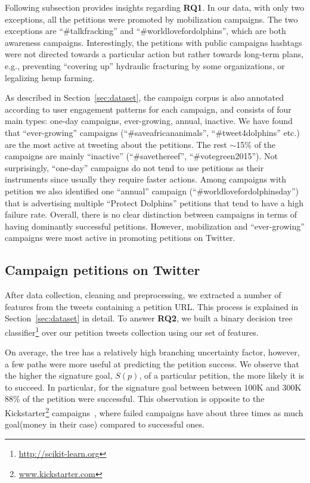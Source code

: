 Following subsection provides insights regarding \textbf{RQ1}.
In our data, with only two exceptions, all the petitions were promoted by mobilization campaigns. The two exceptions are ``\#talkfracking'' and ``\#worldlovefordolphins'', which are both awareness campaigns.
Interestingly, the petitions with public campaigns hashtags were not directed towards a particular action but rather towards long-term plans, e.g., preventing ``covering up'' hydraulic fracturing by some organizations, or legalizing hemp farming.

As described in Section~\ref{sec:dataset}, the campaign corpus is also annotated according to user engagement patterns for each campaign, and consists of four main types: one-day campaigns, ever-growing, annual, inactive.
We have found that ``ever-growing'' campaigns (``\#saveafricananimals'', ``\#tweet4dolphins'' etc.) are the most active at tweeting about the petitions.
The rest $\sim$15\% of the campaigns are mainly ``inactive'' (``\#savethereef'', ``\#votegreen2015'').
Not surprisingly, ``one-day'' campaigns do not tend to use petitions as their instruments since usually they require faster actions.
Among campaigns with petition we also identified one ``annual'' campaign (``\#worldlovefordolphinsday'') that is advertising multiple ``Protect Dolphins'' petitions that tend to have a high failure rate.
Overall, there is no clear distinction between campaigns in terms of having dominantly successful petitions. However, mobilization and ``ever-growing'' campaigns were most active in promoting petitions on Twitter.

\subsection{Campaign petitions on Twitter}
After data collection, cleaning and preprocessing, we extracted a number of features from the tweets containing a petition URL.
This process is explained in Section~\ref{sec:dataset} in detail.
To answer \textbf{RQ2}, we built a binary decision tree classifier\footnote{ \url{http://scikit-learn.org} } over our petition tweets collection using our set of features.

On average, the tree has a relatively high branching uncertainty factor, however, a few paths were more useful at predicting the petition success.
We observe that the higher the signature goal, $S(p)$, of a particular petition, the more likely it is to succeed.
In particular, for the signature goal between between 100K and 300K 88\% of the petition were successful.
This observation is opposite to the Kickstarter\footnote{\url{www.kickstarter.com}} campaigns~\cite{Etter2013}, where failed campaigns have about three times as much goal(money in their case) compared to successful ones.

